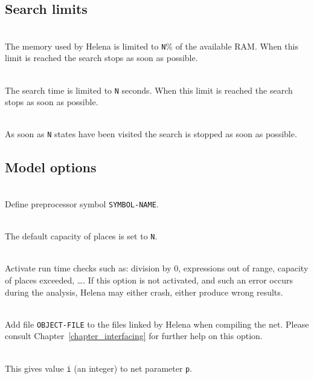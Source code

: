\subsection{Search limits}
\label{subsection:limits}
\begin{description}
\item{}\\ The memory used by Helena is
  limited to \texttt{N}\% of the available RAM.  When this limit is
  reached the search stops as soon as possible.
\item{}\\ The search time is limited to
  \texttt{N} seconds.  When this limit is reached the search stops as
  soon as possible.
\item{}\\ As soon as \texttt{N} states
  have been visited the search is stopped as soon as possible.
\end{description}

\subsection{Model options}
\begin{description}
\item{}\\ Define
  preprocessor symbol \texttt{SYMBOL-NAME}.
\item{}\\ The default capacity of places is
  set to \texttt{N}.
\item{}\\ Activate run time checks such
  as: division by 0, expressions out of range, capacity of places
  exceeded, \dots. If this option is not activated, and such an error
  occurs during the analysis, Helena may either crash, either produce
  wrong results.
\item{}\\ Add file \texttt{OBJECT-FILE}
  to the files linked by Helena when compiling the net.  Please
  consult Chapter~\ref{chapter_interfacing} for further help on this
  option.
\item{}\\ This gives value \texttt{i}
  (an integer) to net parameter \texttt{p}.
\end{description}

